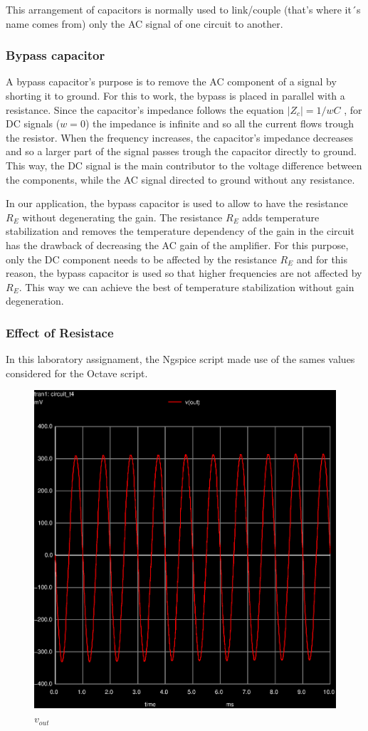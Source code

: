 This arrangement of capacitors is normally used to link/couple (that’s where it´s name comes from) only the AC signal of one circuit to another.

\subsubsection{Bypass capacitor}

A bypass capacitor’s purpose is to remove the AC component of a signal by shorting it to ground.
For this to work, the bypass is placed in parallel with a resistance. Since the capacitor’s impedance follows the equation $|Z_c|=1/wC$ , for DC signals ($w=0$) the impedance is infinite and so all the current flows trough the resistor. When the frequency increases, the capacitor’s impedance decreases and so a larger part of the signal passes trough the capacitor directly to ground. This way, the DC signal is the main contributor to the voltage difference between the components, while the AC signal directed to ground without any resistance.

In our application, the bypass capacitor is used to allow to have the resistance $R_E$ without degenerating the gain. The resistance $R_E$ adds temperature stabilization and removes the temperature dependency of the gain in the circuit has the drawback of decreasing the AC gain of the amplifier. For this purpose, only the DC component needs to be affected by the resistance $R_E$ and for this reason, the bypass capacitor is used so that higher frequencies are not affected by $R_E$. This way we can achieve the best of temperature stabilization without gain degeneration.

\subsubsection{Effect of Resistace }


In this laboratory assignament, the Ngspice script made use of the sames values considered for
the Octave script.


\begin{figure}[ht]
	\centering
	\includegraphics[width=0.6\linewidth]{vo1.eps}
	\caption{$v_{out}$}
\label{fig:graph_global}
\end{figure}

